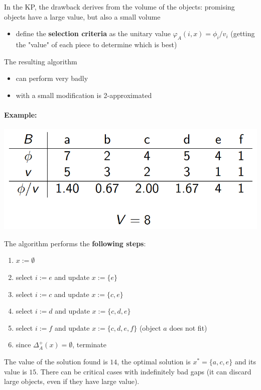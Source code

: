 In the KP, the drawback derives from the volume of the objects: promising objects have a large value, but also a small volume
\begin{itemize}
	\item define the \textbf{selection criteria} as the unitary value $\varphi_A (i, x) = \phi_i / v_i$ (getting the "value" of each piece to determine which is best)
\end{itemize}

The resulting algorithm
\begin{itemize}
	\item can perform very badly
	\item with a small modification is 2-approximated
\end{itemize}

\vfill

\paragraph{Example:}
\begin{center}
	\includegraphics[width=0.5\columnwidth]{img/HKP1}
\end{center}
The algorithm performs the \textbf{following steps}:
\begin{enumerate}
	\item $x := \emptyset$
	\item select $i := e$ and update $x := \{e\}$
	\item select $i := c$ and update $x := \{c, e\}$
	\item select $i := d$ and update $x := \{c, d, e\}$
	\item select $i := f$ and update $x := \{c, d, e, f \}$ (object $a$ does not fit)
	\item since $\Delta_A^+ (x) = \emptyset$, terminate
\end{enumerate}
The value of the solution found is $14$, the optimal solution is $x^\ast = \{a, c, e\}$ and its value is $15$. There can be critical cases with indefinitely bad gaps (it can discard large objects, even if they have large value).

\newpage

